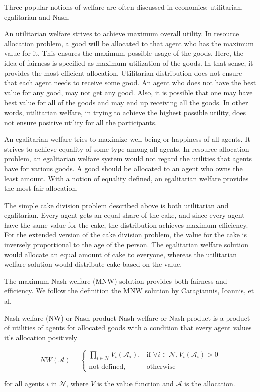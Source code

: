 Three popular notions of welfare are often discussed in economics: utilitarian, egalitarian and Nash.

An utilitarian welfare strives to achieve maximum overall utility. In resource allocation problem, a good will be allocated to that agent who has the maximum value for it. This ensures the maximum possible usage of the goods. Here, the idea of fairness is specified as maximum utilization of the goods. In that sense, it provides the most efficient allocation. Utilitarian distribution does not ensure that each agent needs to receive some good. An agent who does not have the best value for any good, may not get any good. Also, it is possible that one may have best value for all of the goods and may end up receiving all the goods. In other words, utilitarian welfare, in trying to achieve the highest possible utility, does not ensure positive utility for all the participants.

An egalitarian welfare tries to maximize well-being or happiness of all agents. It strives to achieve equality of some type among all agents. In resource allocation problem, an egalitarian welfare system would not regard the utilities that agents have for various goods. A good should be allocated to an agent who owns the least amount. With a notion of equality defined, an egalitarian welfare provides the most fair allocation.

The simple cake division problem described above is both utilitarian and egalitarian. Every agent gets an equal share of the cake, and since every agent have the same value for the cake, the distribution achieves maximum efficiency. For the extended version of the cake division problem, the value for the cake is inversely proportional to the age of the person. The egalitarian welfare solution would allocate an equal amount of cake to everyone, whereas the utilitarian welfare solution would distribute cake based on the value.

The maximum Nash welfare (MNW) solution provides both fairness and efficiency. We follow the definition the MNW solution by Caragiannis, Ioannis, et al. \cite{caragiannis2016unreasonable}

\begin{definition}{Nash welfare (NW) or Nash product} \label{def_nw}
Nash welfare or Nash product is a product of utilities of agents for allocated goods with a condition that every agent values it's allocation positively

\begin{equation}
    NW(\mathcal{A}) = 
    \begin{cases}
    \prod_{i \in \mathcal{N}} V_i(\mathcal{A}_i), & \text{if } \forall i \in \mathcal{N}, V_i(\mathcal{A}_i) > 0 \\
    \text{not defined}, & \text{otherwise}
    \end{cases}
\end{equation}

for all agents $i$ in $\mathcal{N}$, where $V$ is the value function and $\mathcal{A}$ is the allocation.
\end{definition}

